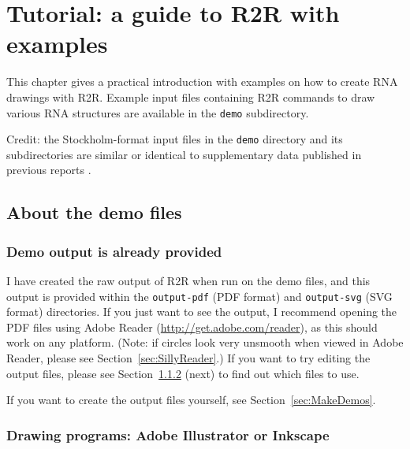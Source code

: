 \documentclass[letterpaper,12pt]{report}
\begin{document}
\chapter{Tutorial: a guide to R2R with examples}
\label{GettingStarted}

This chapter gives a practical introduction with examples on how to create RNA drawings with R2R.
Example input files containing R2R commands to draw various RNA structures are available in the {\tt demo} subdirectory.

Credit: the Stockholm-format input files in the {\tt demo} directory and its subdirectories are similar or identical to supplementary data published in previous reports \cite{Weinberg22Motifs,SAMIV,RegulskiMoco,SAH,Weinberg104Motifs,CoolRNAs,GEMMII}.

\section{About the demo files}

\subsection{Demo output is already provided}

I have created the raw output of R2R when run on the demo files, and this output is provided within the {\tt output-pdf} (PDF format) and {\tt output-svg} (SVG format) directories.
If you just want to see the output, I recommend opening the PDF files using Adobe Reader (\url{http://get.adobe.com/reader}), as this should work on any platform.
(Note: if circles look very unsmooth when viewed in Adobe Reader, please see Section~\ref{sec:SillyReader}.)
If you want to try editing the output files, please see Section~\ref{sec:pdforsvg} (next) to find out which files to use.

If you want to create the output files yourself, see Section~\ref{sec:MakeDemos}.

\subsection{Drawing programs: Adobe Illustrator or Inkscape}
\label{sec:pdforsvg}
\end{document}
